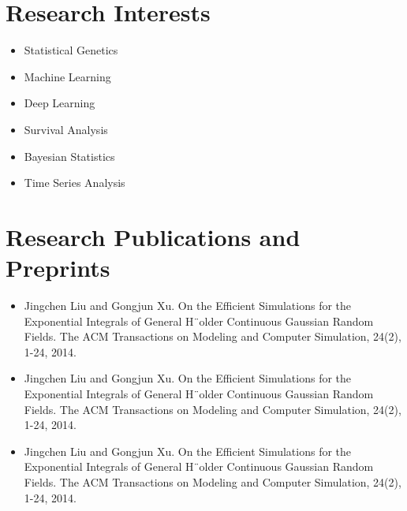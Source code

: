 \documentclass[letterpaper,11pt]{article}
\newcommand{\resumeSubHeadingListEnd}{\end{itemize}}
\begin{document}
\section{Research Interests}
    \begin{multicols}{3}  %
        \begin{itemize} [itemsep=0pt, parsep=0pt]
            \item\small Statistical Genetics
            \item\small Machine Learning
            \item\small Deep Learning
            \item\small Survival Analysis
            \item\small Bayesian Statistics
            \item\small Time Series Analysis
        \end{itemize}
    \end{multicols}
\vspace{-5pt}

\section{Research Publications and Preprints}
\begin{itemize}[itemsep=0pt, parsep=0pt]
    \item\small Jingchen Liu and Gongjun Xu. On the Efficient Simulations for the Exponential Integrals of General H¨older Continuous Gaussian Random Fields. The ACM Transactions on Modeling and Computer Simulation, 24(2), 1-24, 2014.
    \vspace{4pt}
    \item\small Jingchen Liu and Gongjun Xu. On the Efficient Simulations for the Exponential Integrals of General H¨older Continuous Gaussian Random Fields. The ACM Transactions on Modeling and Computer Simulation, 24(2), 1-24, 2014.
    \vspace{4pt}
    \item\small Jingchen Liu and Gongjun Xu. On the Efficient Simulations for the Exponential Integrals of General H¨older Continuous Gaussian Random Fields. The ACM Transactions on Modeling and Computer Simulation, 24(2), 1-24, 2014.
\end{itemize}
\vspace{-18pt}

\end{document}
